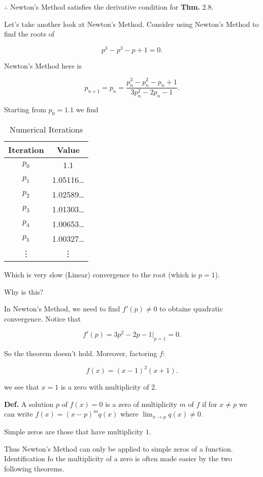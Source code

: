 \documentclass[12pt]{article}
\newcommand{\defn}{\textbf{Def.}\xspace}
\newcommand{\thm}{\textbf{Thm.}\xspace}
\begin{document}
$\therefore$ Newton's Method satisfies the derivative condition for \thm 2.8.

\pagebreak

Let's take another look at Newton's Method. Consider using Newton's Method to
find the roots of

\[
p^3 - p^3 - p + 1 = 0
.\]

Newton's Method here is

\[
  p_{n+1} = p_n = \frac{p_n^3 - p_n^2 - p_n + 1}{3p_n^2 - 2p_n -1}
.\]

Starting from $p_0 = 1.1$ we find

\begin{table}[h]
  \centering
  \begin{tabular}{c|c}
    \textbf{Iteration} & \textbf{Value} \\
    \hline
    $p_0$ & 1.1 \\
    $p_1$ & 1.05116\ldots \\
    $p_2$ & 1.02589\ldots \\
    $p_3$ & 1.01303\ldots \\
    $p_4$ & 1.00653\ldots \\
    $p_5$ & 1.00327\ldots \\
    \vdots & \vdots
  \end{tabular}
  \caption{Numerical Iterations}
  \label{tab:iterations}
\end{table}

Which is very slow (Linear) convergence to the root (which is $p=1$).

Why is this?

In Newton's Method, we need to find $f'(p) \neq 0 $ to obtaine quadratic 
convergence. Notice that

\[
  f'(p) = 3p^2 - 2p - 1 |_{p=1} = 0
.\]

So the theorem doesn't hold. Moreover, factoring $f$:

\[
f(x) = (x-1)^2(x+1)
.\]

we see that $x=1$ is a zero with multiplicity of $2$.

\defn A solution $p$ of $f(x) = 0$ is a zero of multiplicity $m$ of $f$ if for 
$x\ne p$ we can write $f(x) = (x-p)^m q(x)$ where $\lim_{x\to p} q(x) \neq 0$.

Simple zeros are those that have multiplicity $1$.

Thus Newton's Method can only be applied to simple zeros of a function.
Identification fo the multiplicity of a zero is often made easier by the two
following theorems.
\end{document}
